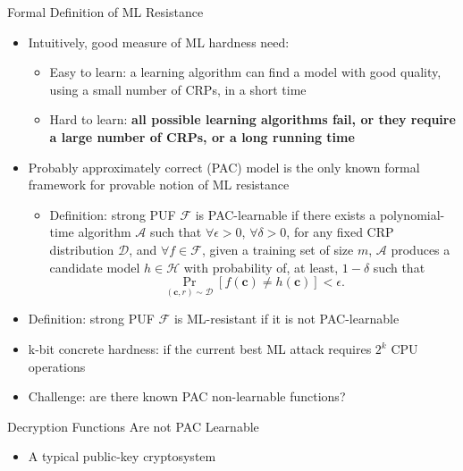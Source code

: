 \begin{frame}{Formal Definition of ML Resistance}
\begin{itemize}
    \item Intuitively, good measure of ML hardness need:
        \begin{itemize}
            \item Easy to learn: a learning algorithm can find a model with good quality, using a small number of CRPs, in a short time
            \item Hard to learn: \textbf{all possible learning algorithms fail, or they require a large number of CRPs, or a long running time}
        \end{itemize}
    \item Probably approximately correct (PAC) model is the only known formal framework for provable notion of ML resistance
        \begin{itemize}
            \item Definition: strong PUF $\mathcal{F}$ is PAC-learnable if there exists a polynomial-time algorithm $\mathcal{A}$ such that $\forall \epsilon > 0$, $\forall \delta >0$, for any fixed CRP distribution $\mathcal{D}$, and $\forall f\in\mathcal{F}$, given a training set of size $m$, $\mathcal{A}$ produces a candidate model $h\in\mathcal{H}$ with probability of, at least, $1-\delta$ such that
\begin{equation*}
\Pr_{(\mathbf{c},r)\sim\mathcal{D}}[f(\mathbf{c})\neq h(\mathbf{c})] < \epsilon.
\end{equation*}
        \end{itemize}
    \item Definition: strong PUF $\mathcal{F}$ is ML-resistant if it is not PAC-learnable
    \item k-bit concrete hardness: if the current best ML attack requires $2^k$ CPU operations 
    \item Challenge: are there known PAC non-learnable functions?
\end{itemize} 
\end{frame}

\begin{frame}{Decryption Functions Are not PAC Learnable}
\begin{itemize}
    \item A typical public-key cryptosystem
    
\end{itemize}    
\end{frame}

